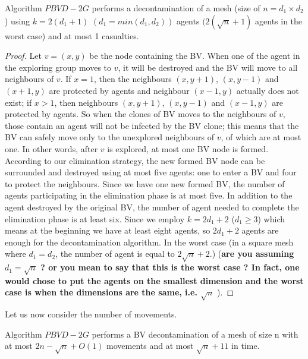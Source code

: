 \begin{theorem}
Algorithm $PBVD-2G$  performs a decontamination of a mesh (size of $n=d_1\times d_2$) using $k=2(d_1+1)$ $(d_1=min(d_1, d_2))$ agents $(2(\sqrt{n}+1)$ agents in the worst case) and at most 1 casualties. 
\end{theorem}
\begin{proof}
Let $v=(x, y)$ be the node containing the BV. When one of the agent in the exploring group moves to $v$, it will be destroyed and the BV will move to all neighbours of $v$. If $x=1$, then the neighbours $(x, y+1)$, $(x, y-1)$ and $(x+1, y)$ are protected by agents and neighbour $(x-1, y)$ actually does not exist; if $x>1$, then neighbours $(x, y+1)$, $(x, y-1)$ and $(x-1, y)$ are protected by agents. So when the clones of BV moves to the neighbours of $v$, those contain an agent will not be infected by the BV clone; this means that the BV can safely move only to the unexplored neighbours of $v$, of which are at most one. In other words, after $v$ is explored, at most one BV node is formed. According to our elimination strategy, the new formed BV node can be surrounded and destroyed using at most five agents: one to enter a BV and four to protect the neighbours. Since we have one new formed BV, the number of agents participating in the elimination phase is at most five. In addition to the agent destroyed by the original BV, the number of agent needed to complete the elimination phase is at least six. Since we employ $k=2d_1+2$ ($d_1\geq 3$) which means at the beginning we have at least eight agents, so $2d_1+2$ agents are enough for the decontamination algorithm. In the worst case (in a square mesh where $d_1=d_2$, the number of agent is equal to $2\sqrt{n}+2$.)
({\bf are you assuming  $d_1 = \sqrt n $ ? or you mean to say that this is the worst case ? In fact, one would chose to put the agents on  the smallest dimension and the worst case is when the dimensions are the same, i.e. $\sqrt n$ }).
\end{proof}
Let us now consider the number of movements.
\begin{theorem}
Algorithm $PBVD-2G$  performs a BV decontamination of a mesh of size n with at most $2n-\sqrt{n}+O(1)$ movements and at most $\sqrt{n}+11$ in time.
\end{theorem}
